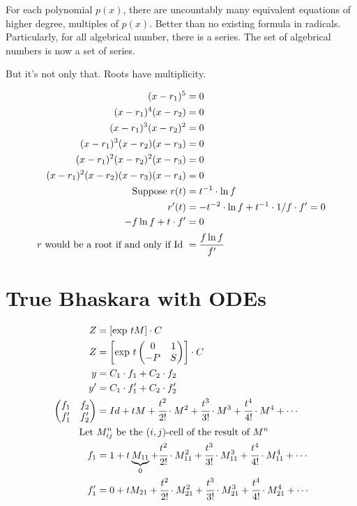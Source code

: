 \documentclass[12pt,a4paper]{article}
\begin{document}
\vspace{3mm}

For each polynomial $p(x)$, there are uncountably many equivalent equations of higher degree, multiples of $p(x)$. Better than no existing formula in radicals. Particularly, for all algebrical number, there is a series. The set of algebrical numbers is now a set of series.

But it's not only that. Roots have multiplicity.

\begin{align}
(x - r_1)^5 &= 0 \\
(x - r_1)^4 (x - r_2) &= 0 \\
(x - r_1)^3 (x - r_2)^2 &= 0 \\
(x - r_1)^3 (x - r_2)(x - r_3) &= 0 \\
(x - r_1)^2 (x - r_2)^2 (x - r_3) &= 0 \\
(x - r_1)^2 (x - r_2) (x - r_3)(x - r_4) &= 0 \\
\text{Suppose }r(t) &= t^{-1} \cdot \ln f \\
r'(t) &= - t^{-2} \cdot \ln f + t^{-1}\cdot 1/f \cdot f' = 0 \\
- f \ln f + t \cdot f' &= 0 \\
r\text{ would be a root if and only if Id } &= \cfrac{f \ln f}{f'}
\end{align}

\section{True Bhaskara with ODEs}

\begin{align}
Z &= \left[ \exp\, t M \right] \cdot C \\
Z &= \left[ \exp\, t \left(\begin{matrix}0 & 1 \\ -P & S \end{matrix}\right) \right] \cdot C \\
 y &= C_1 \cdot f_1 + C_2 \cdot f_2 \\
 y' &= C_1 \cdot f_1' + C_2 \cdot f_2' \\
 \left(\begin{matrix}f_1 & f_2 \\ f_1' & f_2' \end{matrix}\right) &= Id + tM + \cfrac{t^2}{2!}\cdot M^2 + \cfrac{t^3}{3!}\cdot M^3 + \cfrac{t^4}{4!}\cdot M^4 + \cdots \\
 \text{Let } &M_{ij}^n \text{ be the }(i,j)\text{-cell of the result of } M^n \nonumber \\
 f_1 &= 1 + t\underbrace{M_{11}}_{0} + \cfrac{t^2}{2!}\cdot M^2_{11} + \cfrac{t^3}{3!}\cdot M^3_{11} + \cfrac{t^4}{4!}\cdot M^4_{11} + \cdots \\
 f_1' &= 0 + tM_{21} + \cfrac{t^2}{2!}\cdot M^2_{21} + \cfrac{t^3}{3!}\cdot M^3_{21} + \cfrac{t^4}{4!}\cdot M^4_{21} + \cdots
\end{align}
\end{document}

